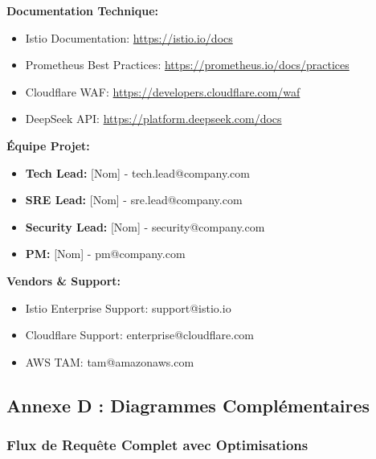 \documentclass[12pt,a4paper]{article}
\begin{document}
\textbf{Documentation Technique:}
\begin{itemize}[noitemsep]
    \item Istio Documentation: \url{https://istio.io/docs}
    \item Prometheus Best Practices: \url{https://prometheus.io/docs/practices}
    \item Cloudflare WAF: \url{https://developers.cloudflare.com/waf}
    \item DeepSeek API: \url{https://platform.deepseek.com/docs}
\end{itemize}

\textbf{Équipe Projet:}
\begin{itemize}[noitemsep]
    \item \textbf{Tech Lead:} [Nom] - tech.lead@company.com
    \item \textbf{SRE Lead:} [Nom] - sre.lead@company.com
    \item \textbf{Security Lead:} [Nom] - security@company.com
    \item \textbf{PM:} [Nom] - pm@company.com
\end{itemize}

\textbf{Vendors \& Support:}
\begin{itemize}[noitemsep]
    \item Istio Enterprise Support: support@istio.io
    \item Cloudflare Support: enterprise@cloudflare.com
    \item AWS TAM: tam@amazonaws.com
\end{itemize}

\newpage
\subsection{Annexe D : Diagrammes Complémentaires}

\subsubsection{Flux de Requête Complet avec Optimisations}
\end{document}
